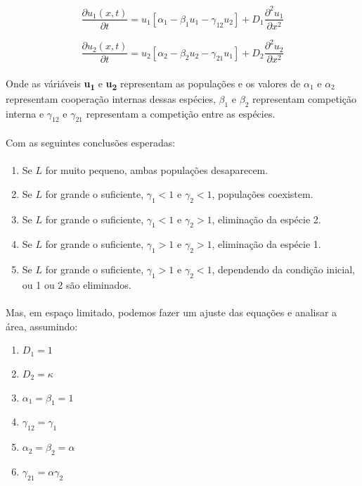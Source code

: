\documentclass{article}
\begin{document}
	$$ \frac{\partial u_1(x,t)}{\partial t} = u_1 \left[\alpha_1 - \beta_1 u_1  - \gamma_{12} u_2 \right] + D_1 \frac{\partial^2 u_1}{\partial x^2} $$
	
	$$ \frac{\partial u_2(x,t)}{\partial t} = u_2 \left[\alpha_2 - \beta_2 u_2  - \gamma_{21} u_1 \right] + D_2 \frac{\partial^2 u_2}{\partial x^2} $$
	
	\paragraph{}
	Onde as váriáveis \textbf{u\textsubscript{1}} e \textbf{u\textsubscript{2}} representam as populações e os valores de $\alpha_1$ e $\alpha_2$ representam cooperação internas dessas espécies, $\beta_1$ e $\beta_2$ representam competição interna e $\gamma_{12}$ e $\gamma_{21}$ representam a competição entre as espécies.
	
	\paragraph{}
	Com as seguintes conclusões esperadas:
	
	\paragraph{}
	\begin{enumerate}
		\item Se $L$ for muito pequeno, ambas populações desaparecem.
		\item Se $L$ for grande o suficiente, $\gamma_1 < 1$ e $\gamma_2 < 1$, populações coexistem.
		\item Se $L$ for grande o suficiente, $\gamma_1 < 1$ e $\gamma_2 > 1$, eliminação da espécie 2.
		\item Se $L$ for grande o suficiente, $\gamma_1 > 1$ e $\gamma_2 > 1$, eliminação da espécie 1.
		\item Se $L$ for grande o suficiente, $\gamma_1 > 1$ e $\gamma_2 < 1$, dependendo da condição inicial, ou 1 ou 2 são eliminados.
	\end{enumerate}

	\paragraph{}
	Mas, em espaço limitado, podemos fazer um ajuste das equações e analisar a área, assumindo:
	\begin{enumerate}
		\item $D_1 = 1$
		\item $D_2 = \kappa$
		\item $\alpha_1 = \beta_1 = 1$
		\item $\gamma_{12} = \gamma_1$
		\item $\alpha_2 = \beta_2 = \alpha$
		\item $\gamma_{21} = \alpha \gamma_2$
	\end{enumerate}
	 
\end{document}
